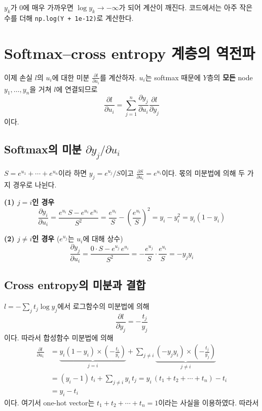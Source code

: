 \documentclass[11pt,a4paper]{article}
\newcommand{\pd}[2]{\frac{\partial #1}{\partial #2}}
\begin{document}
\begin{remarkbox}[$\log 0$ 문제]
$y_k$가 $0$에 매우 가까우면 $\log y_k\to-\infty$가 되어 계산이 깨진다.
코드에서는 아주 작은 수를 더해 \texttt{np.log(Y + 1e-12)}로 계산한다.
\end{remarkbox}

\section{Softmax--cross entropy 계층의 역전파}\label{sec:smce}

이제 손실 $l$의 $u_i$에 대한 미분 $\pd{l}{u_i}$를 계산하자.
$u_i$는 softmax 때문에 $Y$층의 \textbf{모든} node $y_1,\ldots,y_n$을 거쳐 $l$에 연결되므로
\[
\pd{l}{u_i}=\sum_{j=1}^{n}\pd{y_j}{u_i}\pd{l}{y_j}
\]
이다.

\subsection{Softmax의 미분 $\partial y_j/\partial u_i$}

$S=e^{u_1}+\cdots+e^{u_n}$이라 하면 $y_j=e^{u_j}/S$이고 $\pd{S}{u_i}=e^{u_i}$이다.
몫의 미분법에 의해 두 가지 경우로 나뉜다.

\textbf{(1) $j=i$인 경우}
\[
\pd{y_i}{u_i}
=\frac{e^{u_i}\,S-e^{u_i}\,e^{u_i}}{S^2}
=\frac{e^{u_i}}{S}-\left(\frac{e^{u_i}}{S}\right)^2
=y_i-y_i^2=y_i(1-y_i)
\]

\textbf{(2) $j\ne i$인 경우} ($e^{u_j}$는 $u_i$에 대해 상수)
\[
\pd{y_j}{u_i}
=\frac{0\cdot S-e^{u_j}\,e^{u_i}}{S^2}
=-\frac{e^{u_j}}{S}\cdot\frac{e^{u_i}}{S}
=-y_jy_i
\]

\subsection{Cross entropy의 미분과 결합}

$l=-\sum_j t_j\log y_j$에서 로그함수의 미분법에 의해
\[
\pd{l}{y_j}=-\frac{t_j}{y_j}
\]
이다. 따라서 합성함수 미분법에 의해
\[
\begin{aligned}
\pd{l}{u_i}
&=\underbrace{y_i(1-y_i)\times\left(-\frac{t_i}{y_i}\right)}_{j=i}
+\sum_{j\ne i}\underbrace{(-y_jy_i)\times\left(-\frac{t_j}{y_j}\right)}_{j\ne i}\\
&=(y_i-1)\,t_i+\sum_{j\ne i}y_i\,t_j
=y_i\,(t_1+t_2+\cdots+t_n)-t_i\\
&=y_i-t_i
\end{aligned}
\]
이다. 여기서 one-hot vector는 $t_1+t_2+\cdots+t_n=1$이라는 사실을 이용하였다. 따라서
\end{document}
